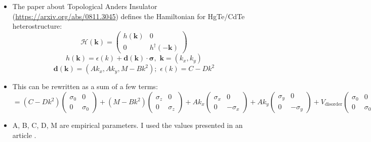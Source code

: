 \documentclass[12pt]{article}
\newcommand{\bb}[1]{\mathbf{#1}}
\numberwithin{equation}{section}
\begin{document}
\begin{itemize}
    \item The paper about Topological Anders Insulator (\url{https://arxiv.org/abs/0811.3045}) defines the 
    Hamiltonian for HgTe/CdTe heterostructure:
    \begin{equation*}
      \mathcal H(\bb k) = \left(
        \begin{array}{cc}
          h(\bb k) & 0 \\
          0 & h^{\dagger}(-\bb k) 
        \end{array}
        \right)
    \end{equation*}
    \begin{equation*}
      h(\bb k) = \epsilon(k) + \bb d (\bb k)\cdot\bb\sigma \textrm{, } \, \bb k = (k_x, k_y) 
    \end{equation*}
    \begin{equation*}
      \bb d(\bb k ) = (Ak_x, Ak_y, M-Bk^2) \textrm{; } \, \epsilon(k) = C-Dk^2
    \end{equation*}
  
    \item This can be rewritten as a sum of a few terms:
    \begin{equation*}
      =(C-Dk^2)\left(
    \begin{array}{cc}
    \sigma_0 & 0 \\
    0 & \sigma_0
    \end{array}
    \right)
    + (M-Bk^2)
    \left(
    \begin{array}{cc}
    \sigma_z & 0 \\
    0 & \sigma_z
    \end{array}
    \right)
    + Ak_x 
    \left(
    \begin{array}{cc}
    \sigma_x & 0 \\
    0 & -\sigma_x
    \end{array}
    \right)
    + Ak_y
    \left(
    \begin{array}{cc}
    \sigma_y & 0 \\
    0 & -\sigma_y
    \end{array}
    \right)
    + V_{\textrm{disorder}} 
    \left(
    \begin{array}{cc}
    \sigma_0 & 0 \\
    0 & \sigma_0
    \end{array}
    \right)
    \end{equation*}
  
    \item A, B, C, D, M are empirical parameters. I used the values presented in an article \cite{andersoninsulator}.
\end{itemize}
\end{document}
